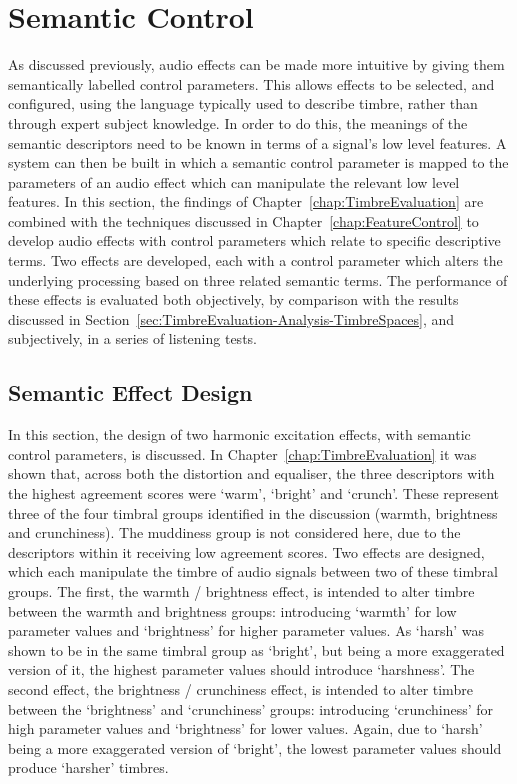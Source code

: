\section{Semantic Control}
\label{sec:PerceptualExperiments-SemanticControl}
	As discussed previously, audio effects can be made more intuitive by giving them semantically labelled control
	parameters. This allows effects to be selected, and configured, using the language typically used to describe
	timbre, rather than through expert subject knowledge. In order to do this, the meanings of the semantic descriptors
	need to be known in terms of a signal's low level features. A system can then be built in which a semantic control
	parameter is mapped to the parameters of an audio effect which can manipulate the relevant low level features. In
	this section, the findings of Chapter~\ref{chap:TimbreEvaluation} are combined with the techniques discussed in
	Chapter~\ref{chap:FeatureControl} to develop audio effects with control parameters which relate to specific
	descriptive terms. Two effects are developed, each with a control parameter which alters the underlying processing
	based on three related semantic terms. The performance of these effects is evaluated both objectively, by
	comparison with the results discussed in Section~\ref{sec:TimbreEvaluation-Analysis-TimbreSpaces}, and
	subjectively, in a series of listening tests.

	\subsection{Semantic Effect Design}
	\label{sec:PerceptualExperiments-SemanticControl-EffectDesign}
		In this section, the design of two harmonic excitation effects, with semantic control parameters, is
		discussed. In Chapter~\ref{chap:TimbreEvaluation} it was shown that, across both the distortion and
		equaliser, the three descriptors with the highest agreement scores were `warm', `bright' and `crunch'.
		These represent three of the four timbral groups identified in the discussion (warmth, brightness and
		crunchiness). The muddiness group is not considered here, due to the descriptors within it receiving low
		agreement scores. Two effects are designed, which each manipulate the timbre of audio signals between two
		of these timbral groups. The first, the warmth / brightness effect, is intended to alter timbre between the
		warmth and brightness groups: introducing `warmth' for low parameter values and `brightness' for higher
		parameter values. As `harsh' was shown to be in the same timbral group as `bright', but being a more
		exaggerated version of it, the highest parameter values should introduce `harshness'. The second effect,
		the brightness / crunchiness effect, is intended to alter timbre between the `brightness' and `crunchiness'
		groups: introducing `crunchiness' for high parameter values and `brightness' for lower values. Again, due
		to `harsh' being a more exaggerated version of `bright', the lowest parameter values should produce
		`harsher' timbres.

